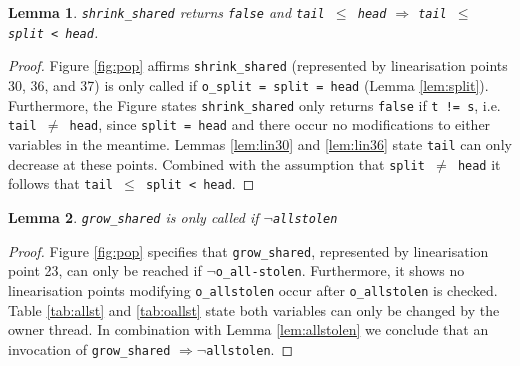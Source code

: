 \documentclass{sig-alternate-br}
\newtheorem{lemma}{Lemma}
\begin{document}
\begin{lemma}
	\texttt{shrink\_shared} returns \texttt{false} and \texttt{tail $\leq$ head} $\Rightarrow$ \texttt{tail $\leq$ split < head}.
	\label{lem:shrsh.var}
\end{lemma}
\begin{proof}
	Figure \ref{fig:pop} affirms \texttt{shrink\_shared} (represented by linearisation points 30, 36, and 37) is only called if \texttt{o\_split = split = head} (Lemma \ref{lem:split}).
	Furthermore, the Figure states \texttt{shrink\_shared} only returns \texttt{false} if \texttt{t != s}, i.e. \texttt{tail $\neq$ head}, since \texttt{split = head} and there occur no modifications to either variables in the meantime.
	Lemmas \ref{lem:lin30} and \ref{lem:lin36} state \texttt{tail} can only decrease at these points. 
	Combined with the assumption that \texttt{split $\neq$ head} it follows that \texttt{tail $\leq$ split < head}.
\end{proof}

\begin{lemma}
	\texttt{grow\_shared} is only called if \texttt{$\neg$allstolen}
	\label{lem:grshr}
\end{lemma}
\begin{proof}
	Figure \ref{fig:pop} specifies that \texttt{grow\_shared}, represented by linearisation point 23, can only be reached if \texttt{$\neg$o\_all-stolen}.
	Furthermore, it shows no linearisation points modifying \texttt{o\_allstolen} occur after \texttt{o\_allstolen} is checked.
	Table \ref{tab:allst} and \ref{tab:oallst} state both variables can only be changed by the owner thread.
	In combination with Lemma \ref{lem:allstolen} we conclude that an invocation of \texttt{grow\_shared} $\Rightarrow \neg$\texttt{allstolen}.
\end{proof}
\end{document}
